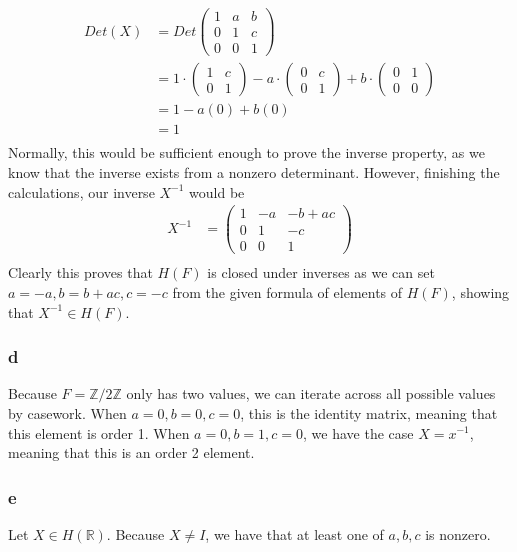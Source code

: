 \documentclass[11 pt]{article}
\theoremstyle{definition}
\theoremstyle{remark}
\begin{document}
\begin{align*}
Det(X) &= Det \begin{pmatrix}
1 & a & b\\
0 & 1 & c\\
0 & 0 & 1
\end{pmatrix} \\
    &= 1 \cdot \begin{pmatrix}
    1 & c \\
    0 & 1
    \end{pmatrix}
    - a \cdot \begin{pmatrix}
    0 & c \\
    0 & 1
    \end{pmatrix}
    + b \cdot \begin{pmatrix}
    0 & 1 \\
    0 & 0
    \end{pmatrix} \\
    &= 1-a(0) + b(0) \\
    &= 1
\\
\end{align*}
Normally, this would be sufficient enough to prove the inverse property, as we know that the inverse exists from a nonzero determinant. However, finishing the calculations, our inverse $X^{-1}$ would be 
\begin{align*}
X^{-1} &= \begin{pmatrix}
1 & -a & -b+ac\\
0 & 1 & -c\\
0 & 0 & 1
\end{pmatrix}
\\
\end{align*}
Clearly this proves that $H(F)$ is closed under inverses as we can set $a = -a, b = b+ac, c = -c$ from the given formula of elements of $H(F)$, showing that $X^{-1} \in H(F)$.


\subsubsection*{d}
Because $F=\mathbb{Z}/2\mathbb{Z}$ only has two values, we can iterate across all possible values by casework. When $a=0,b=0,c=0$, this is the identity matrix, meaning that this element is order 1. When $a=0,b=1,c=0$, we have the case $X=x^{-1}$, meaning that this is an order 2 element. 

\subsubsection*{e}
Let $X \in H(\mathbb{R})$. Because $X \neq I$, we have that at least one of $a,b,c$ is nonzero. 
\end{document}
